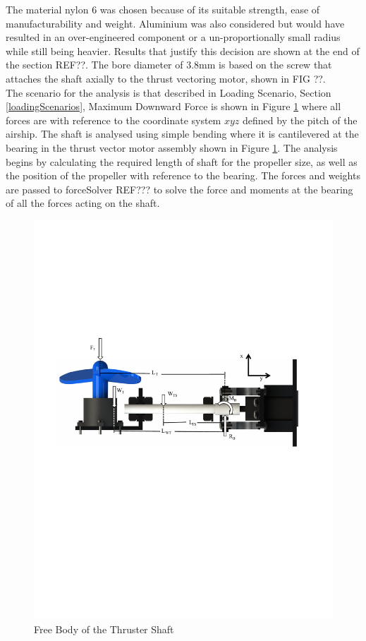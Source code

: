 \documentclass[../main.tex]{subfiles}
\begin{document}
The material nylon 6 was chosen because of its suitable strength, ease of manufacturability and weight. Aluminium was also considered but would have resulted in an over-engineered component or a un-proportionally small radius while still being heavier. Results that justify this decision are shown at the end of the section REF??. The bore diameter of 3.8mm is based on the screw that attaches the shaft axially to the thrust vectoring motor, shown in FIG ??.\\

The scenario for the analysis is that described in Loading Scenario, Section \ref{loadingScenarios}, Maximum Downward Force is shown in Figure \ref{fig:thrusterShaftFBD} where all forces are with reference to the coordinate system $xyz$ defined by the pitch of the airship. The shaft is analysed using simple bending where it is cantilevered at the bearing in the thrust vector motor assembly shown in Figure \ref{fig:thrusterShaftFBD}. The analysis begins by calculating the required length of shaft for the propeller size, as well as the position of the propeller with reference to the bearing. The forces and weights are passed to forceSolver REF??? to solve the force and moments at the bearing of all the forces acting on the shaft.

\begin{figure}[H]
	\centering
	\includegraphics[width=.9\linewidth]{img/analysis/thruster/thrusterShaft.pdf}
	\caption{Free Body of the Thruster Shaft}
	\label{fig:thrusterShaftFBD}
\end{figure}
\end{document}
